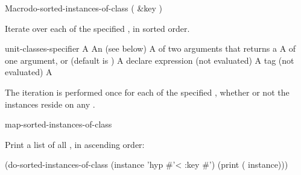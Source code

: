 \documentclass[10pt,twoside,english,pdftex]{article}
\begin{document}
\begin{functiondoc}{Macro}{do-sorted-instances-of-class}%
  {( \&key )
    }
%
%

\fnsyntax

\fnpurpose Iterate over each  of the specified
, in sorted order.

\fnpackage {}

\fnmodule {}

\fnargs
\begin{args}{unit-classes-specifier}
\arg[var] A 
 An 
(see below)
\arg[predicate] A  of two arguments that returns a
\arg[key] A  of one argument, or \nil{} (default is \nil)
\arg[declaration] A declare expression (not evaluated)
\arg[tag] A  tag (not evaluated)
\arg[form] A 
\end{args}

\fndsyntax
\W\supp\tabletop
\unitclassesspec
\subclassingspec

\fndescription The iteration is performed once for each 
of the specified , whether or not the instances reside on
any .

\begin{alsos}{map-sorted-instances-of-class}
\end{alsos}

\fnexample
Print a list of all  , in ascending order:
%
\W\supp
\begin{example}
  (do-sorted-instances-of-class (instance 'hyp #'< :key #')
     (print ( instance)))
\end{example} 

\end{functiondoc}

\end{document}
